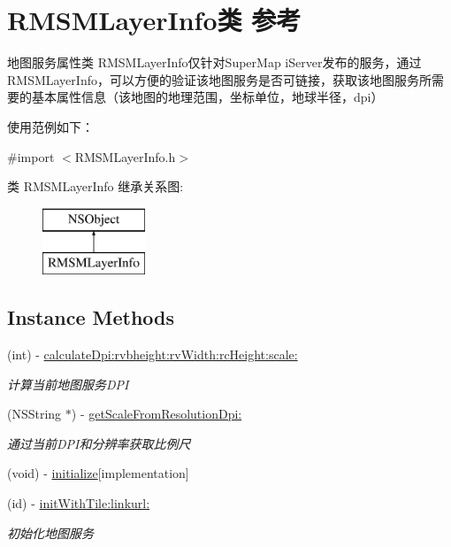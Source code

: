 \hypertarget{interface_r_m_s_m_layer_info}{\section{R\-M\-S\-M\-Layer\-Info类 参考}
\label{interface_r_m_s_m_layer_info}
}


地图服务属性类 R\-M\-S\-M\-Layer\-Info仅针对\-Super\-Map i\-Server发布的服务，通过\-R\-M\-S\-M\-Layer\-Info，可以方便的验证该地图服务是否可链接，获取该地图服务所需要的基本属性信息（该地图的地理范围，坐标单位，地球半径，dpi） \par
 使用范例如下：  




{\ttfamily \#import $<$R\-M\-S\-M\-Layer\-Info.\-h$>$}

类 R\-M\-S\-M\-Layer\-Info 继承关系图\-:\begin{figure}[H]
\begin{center}
\leavevmode
\includegraphics[height=2.000000cm]{interface_r_m_s_m_layer_info}
\end{center}
\end{figure}
\subsection*{Instance Methods}
\begin{DoxyCompactItemize}
\item 
(int) -\/ \hyperlink{interface_r_m_s_m_layer_info_a13c6bea3bc48c7380250a1a552a0c88a}{calculate\-Dpi\-:rvbheight\-:rv\-Width\-:rc\-Height\-:scale\-:}
\begin{DoxyCompactList}\small\item\em 计算当前地图服务\-D\-P\-I \end{DoxyCompactList}\item 
(N\-S\-String $\ast$) -\/ \hyperlink{interface_r_m_s_m_layer_info_a0d4c0633c9f593b8bbb9bb8c08e0458f}{get\-Scale\-From\-Resolution\-Dpi\-:}
\begin{DoxyCompactList}\small\item\em 通过当前\-D\-P\-I和分辨率获取比例尺 \end{DoxyCompactList}\item 
(void) -\/ \hyperlink{interface_r_m_s_m_layer_info_aa03d08cb65294f63ceb1bc1b87134b9c}{initialize}{\ttfamily  \mbox{[}implementation\mbox{]}}
\item 
(id) -\/ \hyperlink{interface_r_m_s_m_layer_info_ae8fc51c3bb7ccdf367d059feb1df7457}{init\-With\-Tile\-:linkurl\-:}
\begin{DoxyCompactList}\small\item\em 初始化地图服务 \end{DoxyCompactList}\end{DoxyCompactItemize}
